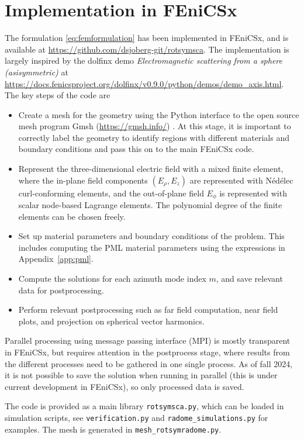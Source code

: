 \documentclass[a4paper,12pt]{article}
\begin{document}
\section{Implementation in FEniCSx}
\label{sec:fenicsx}

The formulation \eqref{eq:femformulation} has been implemented in
FEniCSx, and is available at
\url{https://github.com/dsjoberg-git/rotsymsca}. The implementation is
largely inspired by the dolfinx demo \emph{Electromagnetic scattering
  from a sphere (asisymmetric)} at
\url{https://docs.fenicsproject.org/dolfinx/v0.9.0/python/demos/demo_axis.html}. The
key steps of the code are
\begin{itemize}
\item Create a mesh for the geometry using the Python interface to the
  open source mesh program Gmsh (\url{https://gmsh.info/})
  \cite{Geuzaine+Remacle2009}. At this stage, it is important to
  correctly label the geometry to identify regions with different
  materials and boundary conditions and pass this on to the main
  FEniCSx code.
\item Represent the three-dimensional electric field with a mixed
  finite element, where the in-plane field components
  $(E_{\rho},E_{z})$ are represented with Nédélec curl-conforming
  elements, and the out-of-plane field $E_{\phi}$ is represented with
  scalar node-based Lagrange elements. The polynomial degree of the
  finite elements can be chosen freely.
\item Set up material parameters and boundary conditions of the
  problem. This includes computing the PML material parameters using
  the expressions in Appendix~\ref{app:pml}.
\item Compute the solutions for each azimuth mode index $m$, and save
  relevant data for postprocessing.
\item Perform relevant postprocessing such as far field computation,
  near field plots, and projection on spherical vector harmonics.
\end{itemize}
Parallel processing using message passing interface (MPI) is mostly
transparent in FEniCSx, but requires attention in the postprocess
stage, where results from the different processes need to be gathered
in one single process. As of fall 2024, it is not possible to save the
solution when running in parallel (this is under current development
in FEniCSx), so only processed data is saved.

The code is provided as a main library \texttt{rotsymsca.py}, which
can be loaded in simulation scripts, see \texttt{verification.py} and
\verb+radome_simulations.py+ for examples. The mesh is generated in
\verb+mesh_rotsymradome.py+.
\end{document}
